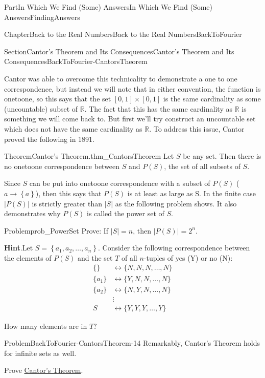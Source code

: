 \documentclass[oneside,10pt,]{book}
\newcommand{\blocktitlefont}{\relax}
\numberwithin{equation}{part}
\newcommand{\abs}[1]{\left|#1\right|}
\newcommand{\RR}{\mathbb {R}}
\newcommand{\amp}{&}
\begin{document}
\begin{partptx}{Part}{In Which We Find (Some) Answers}{}{In Which We Find (Some) Answers}{}{}{FindingAnswers}
\begin{chapterptx}{Chapter}{Back to the Real Numbers}{}{Back to the Real Numbers}{}{}{BackToFourier}
\begin{sectionptx}{Section}{Cantor's Theorem and Its Consequences}{}{Cantor's Theorem and Its Consequences}{}{}{BackToFourier-CantorsTheorem}
\par
Cantor was able to overcome this technicality to demonstrate a one to one correspondence, but instead we will note that in either convention, the function is one\textendash{}to\textendash{}one, so this says that the set \([0,1]\times[0,1]\) is the same cardinality as some (uncountable) subset of \(\RR\).  The fact that this has the same cardinality as \(\RR\) is something we will come back to.  But first we'll try construct an uncountable set which does not have the same cardinality as \(\RR\).  To address this issue, Cantor proved the following in 1891.%
\begin{theorem}{Theorem}{Cantor's Theorem.}{}{thm_CantorsTheorem}%
%
Let \(S\) be any set.  Then there is no one\textendash{}to\textendash{}one correspondence between \(S\) and \(P(S)\), the set of all subsets of \(S\).%
\end{theorem}
Since \(S\) can be put into one\textendash{}to\textendash{}one correspondence with a subset of \(P(S)\) (\(a\rightarrow \left\{a\right\}\)), then this says that \(P(S)\) is at least as large as S. In the finite case \(\abs{P(S)}\) is strictly greater than \(\abs{S}\) as the following problem shows.  It also demonstrates why \(P(S)\) is called the power set of \(S\).%
\begin{problem}{Problem}{}{prob_PowerSet}%
Prove: If \(\abs{S}=n\), then \(\abs{ P(S)}=2^n\).%
\par\smallskip%
\noindent\textbf{\blocktitlefont Hint}.\hypertarget{prob_PowerSet-5}{}\quad{}Let \(S=\left\{a_1,a_2,\ldots,a_n\right\}\).  Consider the following correspondence between the elements of \(P(S)\) and the set \(T\) of all \(n\)-tuples of yes (Y) or no (N):%
\begin{align*}
\{ \}  \amp \leftrightarrow \{N,N,N,\ldots,N\}\\
\{a_1\}\amp \leftrightarrow \{Y,N,N,\ldots ,N\}\\
\{a_2\}\amp \leftrightarrow \{N,Y,N,\ldots,N\}\\
\amp \vdots\\
S\amp \leftrightarrow \{Y,Y,Y,\ldots,Y\}
\end{align*}
%
\par
How many elements are in \(T?\)%
\end{problem}
\begin{problem}{Problem}{}{BackToFourier-CantorsTheorem-14}%
Remarkably, Cantor's Theorem holds for infinite sets as well.%
\par
Prove \hyperref[thm_CantorsTheorem]{Cantor's Theorem}.%

\end{problem}
\end{sectionptx}
\end{chapterptx}
\end{partptx}
\end{document}
